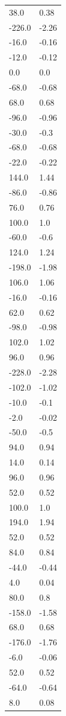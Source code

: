 \begin{longtable}{ll}
38.0 & 0.38 \\
-226.0 & -2.26 \\
-16.0 & -0.16 \\
-12.0 & -0.12 \\
0.0 & 0.0 \\
-68.0 & -0.68 \\
68.0 & 0.68 \\
-96.0 & -0.96 \\
-30.0 & -0.3 \\
-68.0 & -0.68 \\
-22.0 & -0.22 \\
144.0 & 1.44 \\
-86.0 & -0.86 \\
76.0 & 0.76 \\
100.0 & 1.0 \\
-60.0 & -0.6 \\
124.0 & 1.24 \\
-198.0 & -1.98 \\
106.0 & 1.06 \\
-16.0 & -0.16 \\
62.0 & 0.62 \\
-98.0 & -0.98 \\
102.0 & 1.02 \\
96.0 & 0.96 \\
-228.0 & -2.28 \\
-102.0 & -1.02 \\
-10.0 & -0.1 \\
-2.0 & -0.02 \\
-50.0 & -0.5 \\
94.0 & 0.94 \\
14.0 & 0.14 \\
96.0 & 0.96 \\
52.0 & 0.52 \\
100.0 & 1.0 \\
194.0 & 1.94 \\
52.0 & 0.52 \\
84.0 & 0.84 \\
-44.0 & -0.44 \\
4.0 & 0.04 \\
80.0 & 0.8 \\
-158.0 & -1.58 \\
68.0 & 0.68 \\
-176.0 & -1.76 \\
-6.0 & -0.06 \\
52.0 & 0.52 \\
-64.0 & -0.64 \\
8.0 & 0.08 \\

\end{longtable}
